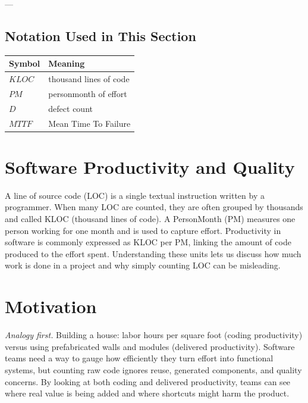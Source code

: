 \documentclass[12pt, a4paper]{article}
\begin{document}
\newpage

---

\newpage

\subsection*{Notation Used in This Section}
\begin{tabular}{@{}ll@{}}
\toprule
Symbol & Meaning \\ \midrule
    $KLOC$ & thousand lines of code \\
    $PM$ & personmonth of effort \\
    $D$ & defect count \\
    $MTTF$ & Mean Time To Failure \\
\bottomrule
\end{tabular}
\vspace{1em}

\section{Software Productivity and Quality}

A line of source code (LOC) is a single textual instruction written by a programmer.  
When many LOC are counted, they are often grouped by thousands and called KLOC (thousand lines of code).  
A PersonMonth (PM) measures one person working for one month and is used to capture effort.  
Productivity in software is commonly expressed as KLOC per PM, linking the amount of code produced to the effort spent.  
Understanding these units lets us discuss how much work is done in a project and why simply counting LOC can be misleading.  

\section{Motivation}
\emph{Analogy first.}  Building a house: labor hours per square foot (coding productivity) versus using prefabricated walls and modules (delivered productivity).  
Software teams need a way to gauge how efficiently they turn effort into functional systems, but counting raw code ignores reuse, generated components, and quality concerns.  By looking at both coding and delivered productivity, teams can see where real value is being added and where shortcuts might harm the product.  
\end{document}
